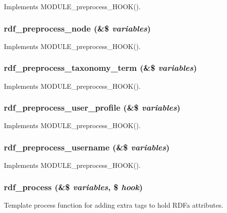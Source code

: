\label{rdf_8module_ad2184c38430ea63d16631cbde524e211}
Implements MODULE\_\-preprocess\_\-HOOK(). \hypertarget{rdf_8module_aacee2147a5aacd82ccc64defded160af}{
\subsubsection[{rdf\_\-preprocess\_\-node}]{\setlength{\rightskip}{0pt plus 5cm}rdf\_\-preprocess\_\-node (\&\$ {\em variables})}}
\label{rdf_8module_aacee2147a5aacd82ccc64defded160af}
Implements MODULE\_\-preprocess\_\-HOOK(). \hypertarget{rdf_8module_aaaad82981045140598f985efaf655c48}{
\subsubsection[{rdf\_\-preprocess\_\-taxonomy\_\-term}]{\setlength{\rightskip}{0pt plus 5cm}rdf\_\-preprocess\_\-taxonomy\_\-term (\&\$ {\em variables})}}
\label{rdf_8module_aaaad82981045140598f985efaf655c48}
Implements MODULE\_\-preprocess\_\-HOOK(). \hypertarget{rdf_8module_a327532324d4f954a6d425729c4c4a582}{
\subsubsection[{rdf\_\-preprocess\_\-user\_\-profile}]{\setlength{\rightskip}{0pt plus 5cm}rdf\_\-preprocess\_\-user\_\-profile (\&\$ {\em variables})}}
\label{rdf_8module_a327532324d4f954a6d425729c4c4a582}
Implements MODULE\_\-preprocess\_\-HOOK(). \hypertarget{rdf_8module_a2bf9ffa91fb6efaeb2d6c8cf23b21d07}{
\subsubsection[{rdf\_\-preprocess\_\-username}]{\setlength{\rightskip}{0pt plus 5cm}rdf\_\-preprocess\_\-username (\&\$ {\em variables})}}
\label{rdf_8module_a2bf9ffa91fb6efaeb2d6c8cf23b21d07}
Implements MODULE\_\-preprocess\_\-HOOK(). \hypertarget{rdf_8module_a33cf33f554fea60776a23c543557ff7b}{
\subsubsection[{rdf\_\-process}]{\setlength{\rightskip}{0pt plus 5cm}rdf\_\-process (\&\$ {\em variables}, \/  \$ {\em hook})}}
\label{rdf_8module_a33cf33f554fea60776a23c543557ff7b}
Template process function for adding extra tags to hold RDFa attributes.

